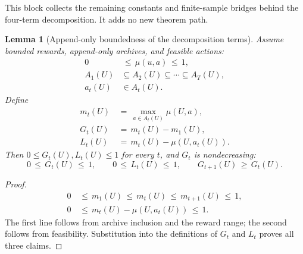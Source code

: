 \documentclass{article} %
\newtheorem{lemma}[theorem]{Lemma}
\begin{document}
\label{app:proofs6}

This block collects the remaining constants and finite-sample bridges behind
the four-term decomposition. It adds no new theorem path.

\begin{lemma}[Append-only boundedness of the decomposition terms]
\label{lem:15}
Assume bounded rewards, append-only archives, and feasible actions:
\begin{align}
\label{eq:app-six-bounded-mu}
0&\,\leq\,\mu(u,a)\,\leq\,1,
\\
\label{eq:app-six-append-only}
A_1(U)&\subseteq A_2(U)\subseteq\cdots\subseteq A_T(U),
\\
\label{eq:app-six-feasible-action}
a_t(U)&\in A_t(U).
\end{align}
Define
\begin{align}
\label{eq:app-six-current-optimum}
m_t(U)
&\,=\,
\max_{a\in A_t(U)}\mu(U,a),
\\
\label{eq:app-six-discovery-repeat}
G_t(U)
&\,=\,
m_t(U)-m_1(U),
\\
\label{eq:app-six-learning-repeat}
L_t(U)
&\,=\,
m_t(U)-\mu(U,a_t(U)).
\end{align}
Then \(0\leq G_t(U),L_t(U)\leq1\) for every \(t\), and \(G_t\) is
nondecreasing:
\begin{equation}
\label{eq:app-six-bounds-GL}
0\,\le\, G_t(U)\,\le\, 1,
\qquad
0\,\le\, L_t(U)\,\le\, 1,
\qquad
G_{t+1}(U)\,\ge\, G_t(U).
\end{equation}
\end{lemma}

\begin{proof}
\begin{equation}
\begin{aligned}
0
&\,\leq\,
m_1(U)
\,\leq\,
m_t(U)
\,\leq\,
m_{t+1}(U)
\,\leq\,
1,\\
0
&\,\leq\,
m_t(U)-\mu(U,a_t(U))
\,\leq\,
1.
\end{aligned}
\end{equation}
The first line follows from archive inclusion and the reward range; the
second follows from feasibility. Substitution into the definitions of
\(G_t\) and \(L_t\) proves all three claims.
\end{proof}
\end{document}
